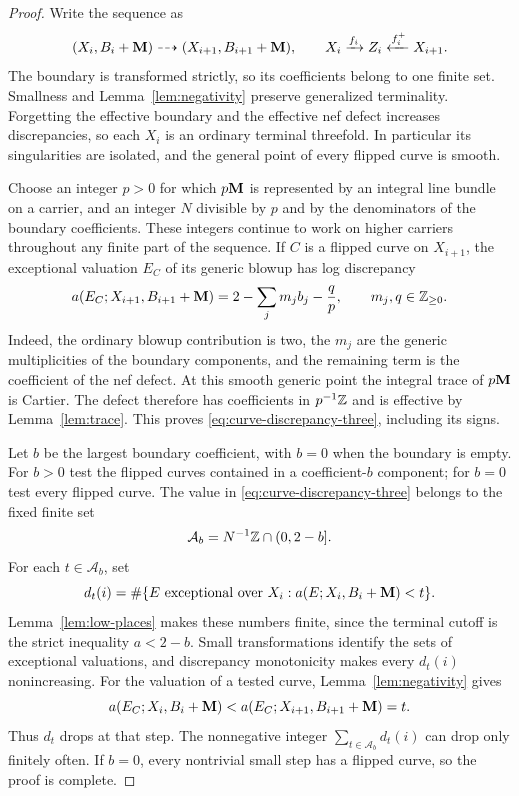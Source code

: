 \begin{proof}
Write the sequence as
\[
 (X_i,B_i+\mathbf M)\dashrightarrow (X_{i+1},B_{i+1}+\mathbf M),
 \qquad X_i\xrightarrow{f_i}Z_i\xleftarrow{f_i^+}X_{i+1}.
\]
The boundary is transformed strictly, so its coefficients belong to one
finite set.  Smallness and Lemma~\ref{lem:negativity} preserve generalized
terminality.  Forgetting the effective boundary and the effective nef defect
increases discrepancies, so each $X_i$ is an ordinary terminal threefold.
In particular its singularities are isolated, and the general point of every
flipped curve is smooth.

Choose an integer $p>0$ for which $p\mathbf M$ is represented by an integral line
bundle on a carrier, and an integer $N$ divisible by $p$ and by the
denominators of the boundary coefficients.  These integers continue to work
on higher carriers throughout any finite part of the sequence.  If $C$ is
a flipped curve on $X_{i+1}$, the exceptional valuation $E_C$ of its generic
blowup has log discrepancy
\begin{equation}\label{eq:curve-discrepancy-three}
 a(E_C;X_{i+1},B_{i+1}+\mathbf M)
   =2-\sum_j m_jb_j-\frac{q}{p},
 \qquad m_j,q\in\mathbb Z_{\geq0}.
\end{equation}
Indeed, the ordinary blowup contribution is two, the $m_j$ are the generic
multiplicities of the boundary components, and the remaining term is the
coefficient of the nef defect.  At this smooth generic point the integral
trace of $p\mathbf M$ is Cartier.  The defect therefore has coefficients in
$p^{-1}\mathbb Z$ and is effective by Lemma~\ref{lem:trace}.  This proves
\eqref{eq:curve-discrepancy-three}, including its signs.

Let $b$ be the largest boundary coefficient, with $b=0$ when the boundary
is empty.  For $b>0$ test the flipped curves contained in a coefficient-$b$
component; for $b=0$ test every flipped curve.  The value in
\eqref{eq:curve-discrepancy-three} belongs to the fixed finite set
\[
 \mathcal A_b=N^{-1}\mathbb Z\cap(0,2-b].
\]
For each $t\in\mathcal A_b$, set
\[
 d_t(i)=\#\{E\text{ exceptional over }X_i:
                   a(E;X_i,B_i+\mathbf M)<t\}.
\]
Lemma~\ref{lem:low-places} makes these numbers finite, since the terminal
cutoff is the strict inequality $a<2-b$.  Small transformations identify
the sets of exceptional valuations, and discrepancy monotonicity makes
every $d_t(i)$ nonincreasing.  For the valuation of a tested curve,
Lemma~\ref{lem:negativity} gives
\[
 a(E_C;X_i,B_i+\mathbf M)
 <a(E_C;X_{i+1},B_{i+1}+\mathbf M)=t.
\]
Thus $d_t$ drops at that step.  The nonnegative integer
$\sum_{t\in\mathcal A_b}d_t(i)$ can drop only finitely often.  If $b=0$,
every nontrivial small step has a flipped curve, so the proof is complete.


\end{proof}
